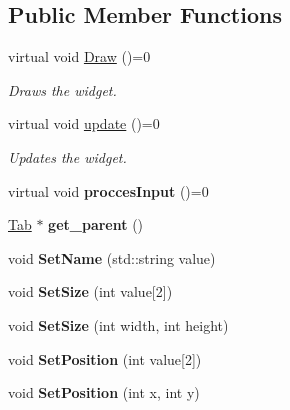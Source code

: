 \subsection*{Public Member Functions}
\begin{DoxyCompactItemize}
\item 
virtual void \hyperlink{class_widget_ac4c2063cd671468ad05d84cfe963c032}{Draw} ()=0
\begin{DoxyCompactList}\small\item\em Draws the widget. \end{DoxyCompactList}\item 
virtual void \hyperlink{class_widget_a726dc97add2c6eb82967144207280ace}{update} ()=0
\begin{DoxyCompactList}\small\item\em Updates the widget. \end{DoxyCompactList}\item 
\mbox{\label{class_widget_a533b16d60fa0fc9c2ca7785e4255eac0}} 
virtual void {\bfseries procces\+Input} ()=0
\item 
\mbox{\label{class_widget_a2c5d9db1b08ad4eeab706e651f6ac762}} 
\hyperlink{class_tab}{Tab} $\ast$ {\bfseries get\+\_\+parent} ()
\item 
\mbox{\label{class_widget_a8d8220d5a7437c99dd4023d82558e4f2}} 
void {\bfseries Set\+Name} (std\+::string value)
\item 
\mbox{\label{class_widget_ac6bb14cfdf16e4471f57dfb32f9769d8}} 
void {\bfseries Set\+Size} (int value\mbox{[}2\mbox{]})
\item 
\mbox{\label{class_widget_a996777d0a2509c53de757188439fecb4}} 
void {\bfseries Set\+Size} (int width, int height)
\item 
\mbox{\label{class_widget_a5ec079e6080dc5f4c3d3b046faa84fc3}} 
void {\bfseries Set\+Position} (int value\mbox{[}2\mbox{]})
\item 
\mbox{\label{class_widget_a4180e120cb6a24ceef7ae23e2086f36f}} 
void {\bfseries Set\+Position} (int x, int y)
\item 
\mbox{\label{class_widget_ab12ac47d032228866c00f5ac0a6c75d8}} 

\end{DoxyCompactItemize}
